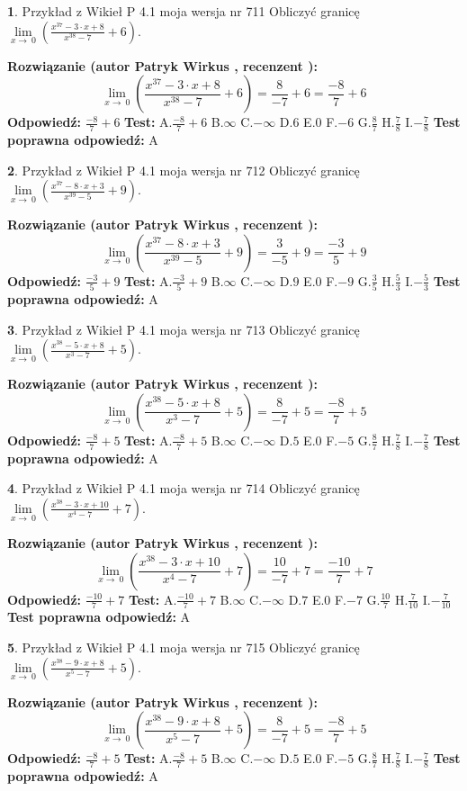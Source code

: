 \documentclass[12pt, a4paper]{article}
\theoremstyle{definition} %
\newtheorem{zad}{}
\newcommand{\zadStart}[1]{\begin{zad}#1\newline}
\newcommand{\zadStop}{\end{zad}}
\newcommand{\rozwStart}[2]{\noindent \textbf{Rozwiązanie (autor #1 , recenzent #2): }\newline}
\newcommand{\rozwStop}{\newline}
\newcommand{\odpStart}{\noindent \textbf{Odpowiedź:}\newline}
\newcommand{\odpStop}{\newline}
\newcommand{\testStart}{\noindent \textbf{Test:}\newline}
\newcommand{\testStop}{\newline}
\newcommand{\kluczStart}{\noindent \textbf{Test poprawna odpowiedź:}\newline}
\newcommand{\kluczStop}{\newline}
\begin{document}
\zadStart{Przykład z Wikieł P 4.1 moja wersja nr 711}
Obliczyć granicę $\lim\limits_{x\to\ 0}(\frac{x^{37}-3 \cdot x +8}{x^{38}-7}+6)$.
\zadStop
\rozwStart{Patryk Wirkus}{}
$$\lim\limits_{x\to\ 0}(\frac{x^{37}-3 \cdot x +8}{x^{38}-7}+6)=\frac{8}{-7}+6=\frac{-8}{7}+6$$
\rozwStop
\odpStart
$\frac{-8}{7}+6$
\odpStop
\testStart
A.$\frac{-8}{7}+6$
B.$\infty$
C.$-\infty$
D.$6$
E.$0$
F.$-6$
G.$\frac{8}{7}$
H.$\frac{7}{8}$
I.$-\frac{7}{8}$
\testStop
\kluczStart
A
\kluczStop



\zadStart{Przykład z Wikieł P 4.1 moja wersja nr 712}
Obliczyć granicę $\lim\limits_{x\to\ 0}(\frac{x^{37}-8 \cdot x +3}{x^{39}-5}+9)$.
\zadStop
\rozwStart{Patryk Wirkus}{}
$$\lim\limits_{x\to\ 0}(\frac{x^{37}-8 \cdot x +3}{x^{39}-5}+9)=\frac{3}{-5}+9=\frac{-3}{5}+9$$
\rozwStop
\odpStart
$\frac{-3}{5}+9$
\odpStop
\testStart
A.$\frac{-3}{5}+9$
B.$\infty$
C.$-\infty$
D.$9$
E.$0$
F.$-9$
G.$\frac{3}{5}$
H.$\frac{5}{3}$
I.$-\frac{5}{3}$
\testStop
\kluczStart
A
\kluczStop



\zadStart{Przykład z Wikieł P 4.1 moja wersja nr 713}
Obliczyć granicę $\lim\limits_{x\to\ 0}(\frac{x^{38}-5 \cdot x +8}{x^{3}-7}+5)$.
\zadStop
\rozwStart{Patryk Wirkus}{}
$$\lim\limits_{x\to\ 0}(\frac{x^{38}-5 \cdot x +8}{x^{3}-7}+5)=\frac{8}{-7}+5=\frac{-8}{7}+5$$
\rozwStop
\odpStart
$\frac{-8}{7}+5$
\odpStop
\testStart
A.$\frac{-8}{7}+5$
B.$\infty$
C.$-\infty$
D.$5$
E.$0$
F.$-5$
G.$\frac{8}{7}$
H.$\frac{7}{8}$
I.$-\frac{7}{8}$
\testStop
\kluczStart
A
\kluczStop



\zadStart{Przykład z Wikieł P 4.1 moja wersja nr 714}
Obliczyć granicę $\lim\limits_{x\to\ 0}(\frac{x^{38}-3 \cdot x +10}{x^{4}-7}+7)$.
\zadStop
\rozwStart{Patryk Wirkus}{}
$$\lim\limits_{x\to\ 0}(\frac{x^{38}-3 \cdot x +10}{x^{4}-7}+7)=\frac{10}{-7}+7=\frac{-10}{7}+7$$
\rozwStop
\odpStart
$\frac{-10}{7}+7$
\odpStop
\testStart
A.$\frac{-10}{7}+7$
B.$\infty$
C.$-\infty$
D.$7$
E.$0$
F.$-7$
G.$\frac{10}{7}$
H.$\frac{7}{10}$
I.$-\frac{7}{10}$
\testStop
\kluczStart
A
\kluczStop



\zadStart{Przykład z Wikieł P 4.1 moja wersja nr 715}
Obliczyć granicę $\lim\limits_{x\to\ 0}(\frac{x^{38}-9 \cdot x +8}{x^{5}-7}+5)$.
\zadStop
\rozwStart{Patryk Wirkus}{}
$$\lim\limits_{x\to\ 0}(\frac{x^{38}-9 \cdot x +8}{x^{5}-7}+5)=\frac{8}{-7}+5=\frac{-8}{7}+5$$
\rozwStop
\odpStart
$\frac{-8}{7}+5$
\odpStop
\testStart
A.$\frac{-8}{7}+5$
B.$\infty$
C.$-\infty$
D.$5$
E.$0$
F.$-5$
G.$\frac{8}{7}$
H.$\frac{7}{8}$
I.$-\frac{7}{8}$
\testStop
\kluczStart
A
\kluczStop
\end{document}
